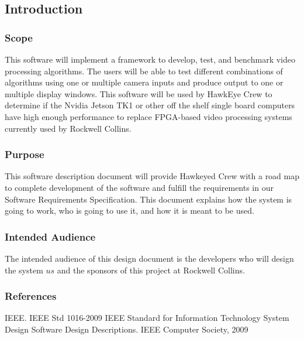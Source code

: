 \subsection{Introduction}
\subsubsection{Scope}
This software will implement a framework to develop, test, and benchmark video processing
algorithms. The users will be able to test different combinations of algorithms using one or multiple
camera inputs and produce output to one or multiple display windows. This software will be used by
HawkEye Crew to determine if the Nvidia Jetson TK1 or other off the shelf single board computers have
high enough performance to replace FPGA-based video processing systems currently used by Rockwell
Collins.\\
\subsubsection{Purpose}
This software description document will provide Hawkeyed Crew with a road map to complete
development of the software and fulfill the requirements in our Software Requirements Specification.
This document explains how the system is going to work, who is going to use it, and how it is meant to
be used.\\
\subsubsection{Intended Audience}
The intended audience of this design document is the developers who will design the system \(us\)
and the sponsors of this project at Rockwell Collins.\\
\subsubsection{References}
IEEE. IEEE Std 1016-2009 IEEE Standard for Information Technology \- System Design \- Software
Design Descriptions. IEEE Computer Society, 2009


